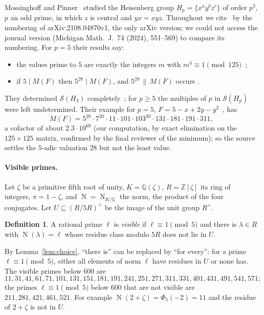 \documentclass[11pt]{article}
\theoremstyle{definition}
\newtheorem{definition}{Definition}
\theoremstyle{remark}
\newcommand{\Z}{\mathbb Z}
\newcommand{\N}{\operatorname{N}}
\newcommand{\cS}{\mathcal S}
\begin{document}
Mossinghoff and Pinner~\cite{mp} studied the Heisenberg group
$H_p=\{x^ay^bz^c\}$ of order $p^3$, $p$ an odd prime, in which $z$ is central
and $yx=xyz$. Throughout we cite~\cite{mp} by the numbering of
arXiv:2108.04870v1, the only arXiv version; we could not access the journal
version (Michigan Math.\ J.\ 74 (2024), 551--569) to compare its numbering.
For $p=5$ their results say:
\begin{itemize}
\item the values prime to $5$ are exactly the integers $m$ with
$m^4\equiv1\pmod{125}$~\cite[Corollary~3.2]{mp};
\item if $5\mid M(F)$ then $5^{28}\mid M(F)$, and $5^{28}\,\|\,M(F)$ occurs
\cite[Theorem~3.4]{mp}.
\end{itemize}
They determined $\cS(H_3)$ completely~\cite[Theorem~3.6]{mp}; for $p\ge5$ the
multiples of $p$ in $\cS(H_p)$ were left undetermined. Their example for
$p=5$, $F=5-x+2y-y^2$~\cite[proof of Theorem~3.4, with $A=2$]{mp}, has
\[
M(F)=5^{28}\cdot7^{20}\cdot11\cdot101\cdot103^{20}\cdot131\cdot181\cdot191\cdot311,
\]
a cofactor of about $2.3\cdot10^{69}$ (our computation, by exact elimination
on the $125\times125$ matrix, confirmed by the final reviewer of the
minimum); so the
source settles the $5$-adic valuation $28$ but not the least value.

\paragraph{Visible primes.}
Let $\zeta$ be a primitive fifth root of unity, $K=\mathbb Q(\zeta)$,
$R=\Z[\zeta]$ its ring of integers, $\pi=1-\zeta$, and $\N=\N_{K/\mathbb Q}$
the norm, the product of the four conjugates. Let $U\subseteq(R/5R)^\times$ be
the image of the unit group $R^\times$.

\begin{definition}\label{def:visible}
A rational prime $\ell$ is \emph{visible} if $\ell\equiv1\pmod5$ and there is
$\lambda\in R$ with $\N(\lambda)=\ell$ whose residue class modulo $5R$ does not
lie in $U$.
\end{definition}

\noindent By Lemma~\ref{lem:choice}, ``there is'' can be replaced by ``for
every'': for a prime $\ell\equiv1\pmod 5$, either all elements of norm $\ell$
have residues in $U$ or none has. The visible primes below $600$ are
\[
11,31,41,61,71,101,131,151,181,191,241,251,271,311,331,401,431,491,541,571;
\]
the primes $\ell\equiv1\pmod5$ below $600$ that are not visible are
$211,281,421,461,521$. For example $\N(2+\zeta)=\Phi_5(-2)=11$ and the residue
of $2+\zeta$ is not in $U$.
\end{document}
